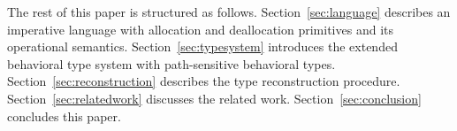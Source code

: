 The rest of this paper is structured as
follows. Section~\ref{sec:language} describes an imperative language
with allocation and deallocation primitives and its operational
semantics. Section~\ref{sec:typesystem} introduces the extended
behavioral type system with path-sensitive behavioral
types. Section~\ref{sec:reconstruction} describes the type
reconstruction procedure.  
Section~\ref{sec:relatedwork} discusses the related work.
Section~\ref{sec:conclusion} concludes this paper.
